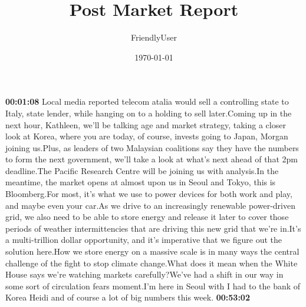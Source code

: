 \documentclass{article}%
\title{Post Market Report}%
\author{FriendlyUser}%
\date{\today}%
\begin{document}
%
\normalsize%
\textbf{00:01:08}%
\newline%
Local media reported telecom atalia would sell a controlling state to Italy, state lender, while hanging on to a holding to sell later.Coming up in the next hour, Kathleen, we'll be talking age and market strategy, taking a closer look at Korea, where you are today, of course, invests going to Japan, Morgan joining us.Plus, as leaders of two Malaysian coalitions say they have the numbers to form the next government, we'll take a look at what's next ahead of that 2pm deadline.The Pacific Research Centre will be joining us with analysis.In the meantime, the market opens at almost upon us in Seoul and Tokyo, this is Bloomberg.For most, it's what we use to power devices for both work and play, and maybe even your car.As we drive to an increasingly renewable power{-}driven grid, we also need to be able to store energy and release it later to cover those periods of weather intermittencies that are driving this new grid that we're in.It's a multi{-}trillion dollar opportunity, and it's imperative that we figure out the solution here.How we store energy on a massive scale is in many ways the central challenge of the fight to stop climate change.What does it mean when the White House says we're watching markets carefully?We've had a shift in our way in some sort of circulation fears moment.I'm here in Seoul with I had to the bank of Korea Heidi and of course a lot of big numbers this week.%
\textbf{00:53:02}%
\newline%
\end{document}
